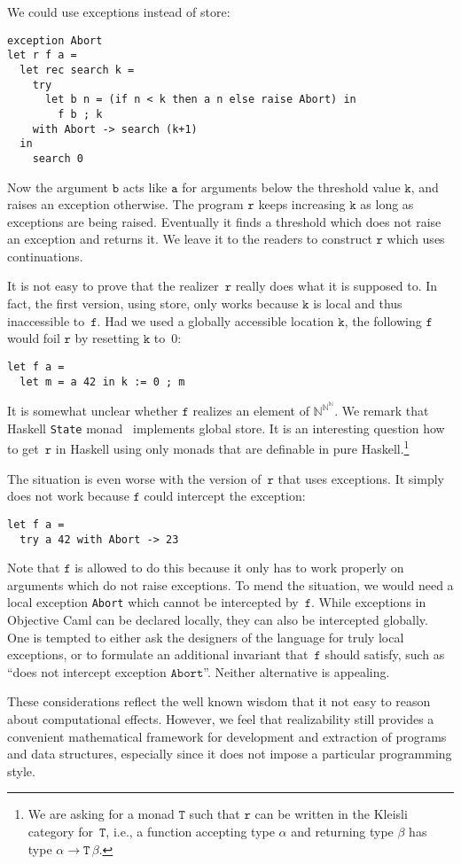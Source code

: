 \documentclass{entcs} \usepackage{prentcsmacro}
\newcommand{\NN}{{\mathbb N}}
\begin{document}
We could use exceptions instead of store:
%
\begin{verbatim}
exception Abort
let r f a =
  let rec search k =
    try
      let b n = (if n < k then a n else raise Abort) in
        f b ; k
    with Abort -> search (k+1)
  in
    search 0
\end{verbatim}
%
Now the argument $\mathtt{b}$ acts like $\mathtt{a}$ for arguments
below the threshold value $\mathtt{k}$, and raises an exception
otherwise. The program $\mathtt{r}$ keeps increasing $\mathtt{k}$ as
long as exceptions are being raised. Eventually it finds a threshold
which does not raise an exception and returns it. We leave it to the
readers to construct $\mathtt{r}$ which uses continuations.

It is not easy to prove that the realizer~$\mathtt{r}$ really does
what it is supposed to. In fact, the first version, using store, only
works because $\mathtt{k}$ is local and thus inaccessible
to~$\mathtt{f}$. Had we used a globally accessible location
$\mathtt{k}$, the following $\mathtt{f}$ would foil $\mathtt{r}$ by
resetting $\mathtt{k}$ to~$0$:
%
\begin{verbatim}
let f a =
  let m = a 42 in k := 0 ; m
\end{verbatim}
%
It is somewhat unclear whether $\mathtt{f}$ realizes an element of
$\NN^{\NN^\NN}$. We remark that Haskell \texttt{State}
monad~\cite{haskell} implements global store. It is an interesting
question how to get~$\mathtt{r}$ in Haskell using only monads that are
definable in pure Haskell.\footnote{We are asking for a monad
  $\mathtt{T}$ such that $\mathtt{r}$ can be written in the Kleisli
  category for~$\mathtt{T}$, i.e., a function accepting type $\alpha$
  and returning type $\beta$ has type $\alpha \to \mathtt{T}\,\beta$.}

The situation is even worse with the version of~$\mathtt{r}$ that uses
exceptions. It simply does not work because $\mathtt{f}$ could
intercept the exception:
%
\begin{verbatim}
let f a =
  try a 42 with Abort -> 23
\end{verbatim}
%
Note that $\mathtt{f}$ is allowed to do this because it only has to
work properly on arguments which do not raise exceptions. To mend the
situation, we would need a local exception \texttt{Abort} which cannot
be intercepted by~$\mathtt{f}$. While exceptions in Objective Caml can
be declared locally, they can also be intercepted globally. One is
tempted to either ask the designers of the language for truly local
exceptions, or to formulate an additional invariant that~$\mathtt{f}$
should satisfy, such as ``does not intercept exception
$\mathtt{Abort}$''. Neither alternative is appealing.

These considerations reflect the well known wisdom that it not easy to
reason about computational effects. However, we feel that
realizability still provides a convenient mathematical framework for
development and extraction of programs and data structures, especially
since it does not impose a particular programming style.



\end{document}
